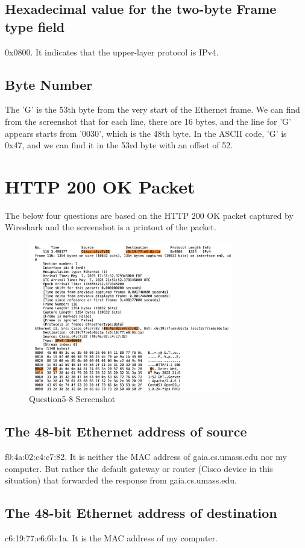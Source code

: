 \documentclass{article}
\begin{document}
\begin{CJK*}{UTF8}{gbsn}
\subsection{Hexadecimal value for the two-byte Frame type field}
0x0800. It indicates that the upper-layer protocol is IPv4.
\subsection{Byte Number}
The 'G' is the 53th byte from the very start of the Ethernet frame. We can find from the screenshot that
for each line, there are 16 bytes, and the line for 'G' appears starts from '0030', which is the 48th byte.
In the ASCII code, 'G' is 0x47, and we can find it in the 53rd byte with an offset of 52.


\section{HTTP 200 OK Packet}
The below four questions are based on the HTTP 200 OK packet captured by Wireshark and
the screenshot is a printout of the packet.
\begin{figure}[H]
    \centering
    \includegraphics[width=0.8\textwidth]{2.png}
    \caption{Question5-8 Screenshot}
\end{figure}
\subsection{The 48-bit Ethernet address of source}
f0:4a:02:c4:c7:82. It is neither the MAC address of gaia.cs.umass.edu nor my computer.
But rather the default gateway or router (Cisco device in this situation) that forwarded the response from gaia.cs.umass.edu.
\subsection{The 48-bit Ethernet address of destination}
c6:19:77:e6:6b:1a. It is the MAC address of my computer.

\end{CJK*}
\end{document}
